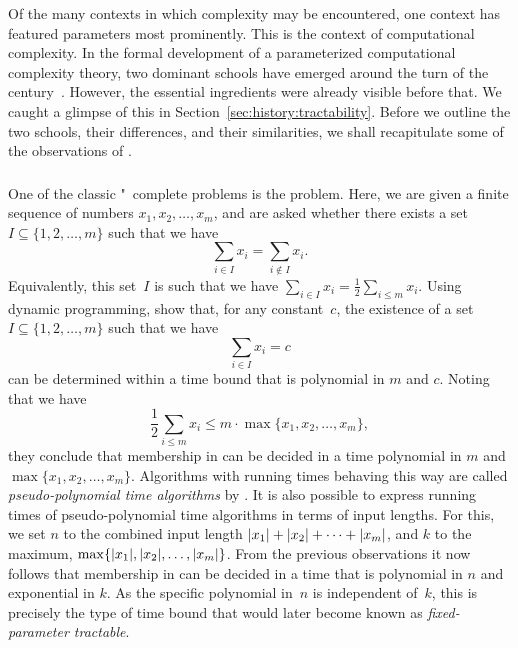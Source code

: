 \label{sec:parameterized_complexity_theory}%

Of the many contexts in which complexity may be encountered, one context has featured parameters most prominently.
This is the context of computational complexity.
In the formal development of a parameterized computational complexity theory, two dominant schools have emerged around the turn of the century~\parencite{downey1999parameterized,flum2006parameterized}.
However, the essential ingredients were already visible before that.
We caught a glimpse of this in Section~\ref{sec:history:tractability}.
Before we outline the two schools, their differences, and their similarities, we shall recapitulate some of the observations of \textcite{garey1979computers}.

\subsubsection{\citeauthor{garey1979computers}}
One of the classic "~complete problems is the  problem.
Here, we are given a finite sequence of numbers $x_1, x_2, \ldots, x_m$, and are asked whether there exists a set $I \subseteq \{1, 2, \ldots, m\}$ such that we have
\begin{equation*}
  \sum_{i \in I} x_i = \sum_{i \notin I} x_i.
\end{equation*}
Equivalently, this set~$I$ is such that we have $\sum_{i \in I} x_i = \frac{1}{2} \sum_{i \le m} x_i$.
Using dynamic programming, \textcite[Section~4.2]{garey1979computers} show that, for any constant~$c$, the existence of a set $I \subseteq \{1, 2, \ldots, m\}$ such that we have
\begin{equation*}
  \sum_{i \in I} x_i = c
\end{equation*}
can be determined within a time bound that is polynomial in $m$ and $c$.
Noting that we have
\begin{equation*}
  \frac{1}{2} \sum_{i \le m} x_i \le m \cdot \max \{x_1, x_2, \ldots, x_m\},
\end{equation*}
they conclude that membership in  can be decided in a time polynomial in $m$ and $\max \{x_1, x_2, \ldots, x_m\}$.
Algorithms with running times behaving this way are called \emph{pseudo-polynomial time algorithms} by \citeauthor{garey1979computers}.
It is also possible to express running times of pseudo-polynomial time algorithms in terms of input lengths.
For this, we set $n$ to the combined input length ${\lvert x_1\rvert} + {\lvert x_2\rvert} + \cdots + {\lvert x_m\rvert}$, and $k$ to the maximum, $\max \{{\lvert x_1\rvert}, {\lvert x_2\rvert}, \ldots, {\lvert x_m\rvert}\}$.
From the previous observations it now follows that membership in  can be decided in a time that is polynomial in $n$ and exponential in $k$.
As the specific polynomial in~$n$ is independent of~$k$, this is precisely the type of time bound that would later become known as \emph{fixed-parameter tractable}.

